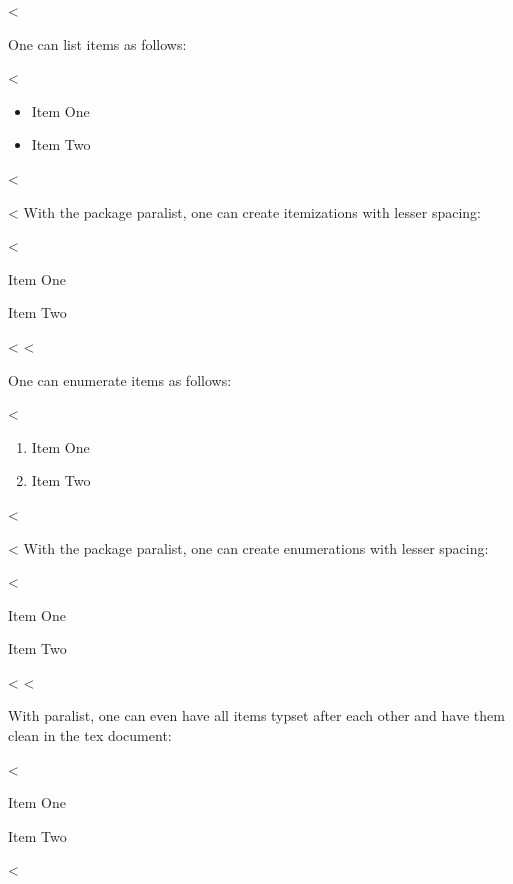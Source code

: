 <%

One can list items as follows:

<%
\begin{itemize}
\item Item One
\item Item Two
\end{itemize}
<%

<%
With the package paralist, one can create itemizations with lesser spacing:

<%
\begin{compactitem}
\item Item One
\item Item Two
\end{compactitem}
<%
<%

One can enumerate items as follows:

<%
\begin{enumerate}
\item Item One
\item Item Two
\end{enumerate}
<%

<%
With the package paralist, one can create enumerations with lesser spacing:

<%
\begin{compactenum}
\item Item One
\item Item Two
\end{compactenum}
<%
<%

With paralist, one can even have all items typset after each other and have them clean in the tex document:

<%
\begin{inparaenum}
\item Item One
\item Item Two
\end{inparaenum}
<%
